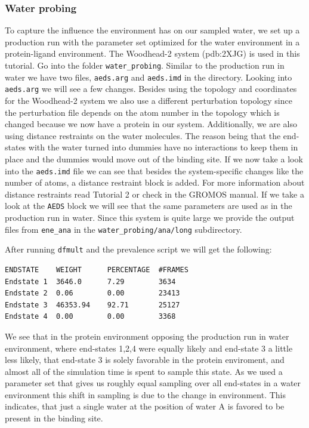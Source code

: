 \subsubsection{Water probing}
To capture the influence the environment has on our sampled water, we set up a production run with the parameter set optimized for the water environment in a protein-ligand environment. The Woodhead-2 system (pdb:2XJG\cite{woodhead2}) is used in this tutorial. Go into the folder \texttt{water\_probing}. Similar to the production run in water we have two files, \texttt{aeds.arg} and \texttt{aeds.imd} in the directory. Looking into \texttt{aeds.arg} we will see a few changes. Besides using the topology and coordinates for the Woodhead-2 system we also use a different perturbation topology since the perturbation file depends on the atom number in the topology which is changed because we now have a protein in our system. Additionally, we are also using distance restraints on the water molecules. The reason being that the end-states with the water turned into dummies have no interactions to keep them in place and the dummies would move out of the binding site. If we now take a look into the \texttt{aeds.imd} file we can see that besides the system-specific changes like the number of atoms, a distance restraint block is added. For more information about distance restraints read Tutorial 2 or check in the GROMOS manual. If we take a look at the \texttt{AEDS} block we will see that the same parameters are used as in the production run in water. Since this system is quite large we provide the output files from \texttt{ene\_ana} in the \texttt{water\_probing/ana/long} subdirectory.

After running \texttt{dfmult} and the prevalence script we will get the following:

\begin{lstlisting}
ENDSTATE    WEIGHT      PERCENTAGE  #FRAMES
Endstate 1  3646.0      7.29        3634
Endstate 2  0.06        0.00        23413
Endstate 3  46353.94    92.71       25127
Endstate 4  0.00        0.00        3368
\end{lstlisting}

We see that in the protein environment opposing the production run in water environment, where end-states 1,2,4 were equally likely and end-state 3 a little less likely, that end-state 3 is solely favorable in the protein enviroment, and almost all of the simulation time is spent to sample this state. As we used a parameter set that gives us roughly equal sampling over all end-states in a water environment this shift in sampling is due to the change in environment. This indicates, that just a single water at the position of water A is favored to be present in the binding site.

